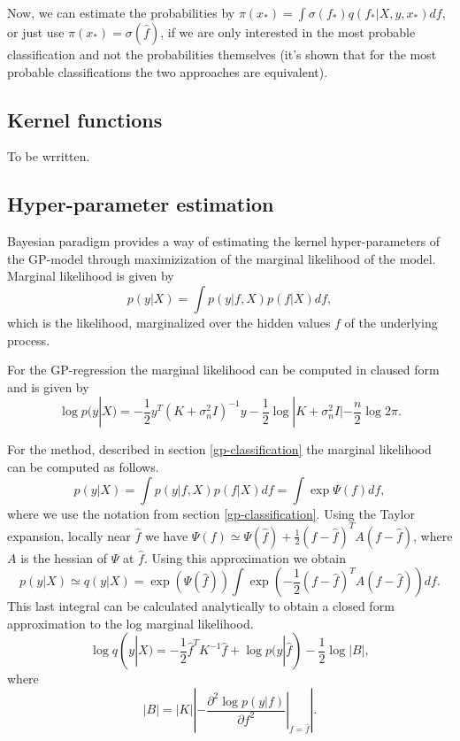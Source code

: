 \documentclass[12pt]{article}
\begin{document}
		Now, we can estimate the probabilities by
		$\pi(x_*) = \int \sigma(f_*) q(f_* | X, y, x_*) df,$
		or just use $\pi(x_*) = \sigma(\hat f)$, if we are only interested in the most probable classification and not the probabilities themselves (it's shown that for the most probable classifications the two approaches are equivalent).
	
\subsection{Kernel functions}
	\hspace{0.6cm}To be wrritten.
	
\subsection{Hyper-parameter estimation}
	\hspace{0.6cm}Bayesian paradigm provides a way of estimating the kernel hyper-parameters of the GP-model through maximizization of the marginal likelihood of the model. Marginal likelihood is given by
	$$p(y | X) = \int p(y | f, X) p(f | X) df,$$
	which is the likelihood, marginalized over the hidden values $f$ of the underlying process.

	For the GP-regression the marginal likelihood can be computed in claused form and is given by
	\begin{equation}
		\label{regression_ml}
		\log p(y | X) = -\frac 1 2 y^{T} (K + \sigma_n^2 I)^{-1} y - \frac 1 2 \log |K + \sigma_n^2 I| - \frac n 2 \log 2 \pi.
	\end{equation}

	For the method, described in section \ref{gp-classification} the marginal likelihood can be computed as follows.
	$$p(y | X) = \int p(y | f, X) p(f | X) df = \int \exp{\Psi(f)} df,$$
	where we use the notation from section \ref{gp-classification}. Using the Taylor expansion, locally near $\hat f$ we have $\Psi(f) \simeq \Psi(\hat f) + \frac 1 2(f - \hat f)^T A (f - \hat f)$, where $A$ is the hessian of $\Psi$ at $\hat f$. Using this approximation we obtain
	$$p(y | X) \simeq q(y | X) = \exp(\Psi(\hat f)) \int \exp( - \frac 1 2 (f - \hat f)^T A (f - \hat f)) df.$$
	This last integral can be calculated analytically to obtain a closed form approximation to the log marginal likelihood. 
	\begin{equation}
		\label{classification_ml}
		\log q(y|X) = -\frac 1 2 \hat f^T K^{-1} \hat f + \log p(y|\hat f) - \frac 1 2 \log|B|,
	\end{equation}
	where 
	$$|B| = |K| \left|- \left. \frac{\partial^2 \log p(y | f)}{\partial f^2} \right|_{f = \hat f} \right|.$$ 
\end{document}
